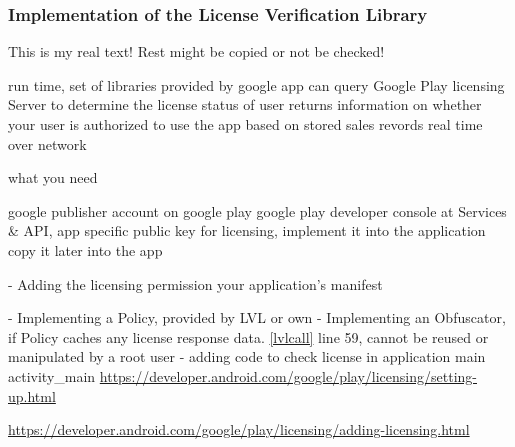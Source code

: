\subsubsection{Implementation of the License Verification Library}\label{subsection:license-google-implementation}
This is my real text! Rest might be copied or not be checked!



%
run time, set of libraries provided by google
app can query Google Play licensing Server to determine the license status of user
returns information on whether your user is authorized to use the app based on stored sales revords
real time over network
\cite{developersLicensingBlog}
%

%
what you need

google publisher account on google play
google play developer console at Services \& API, app specific public key for licensing, implement it into the application
copy it later into the app

\cite{developersLicensingAdding}
%

%
- Adding the licensing permission your application's manifest


- Implementing a Policy, provided by LVL or own
- Implementing an Obfuscator, if Policy caches any license response data. \ref{lvlcall} line 59, cannot be reused or manipulated by a root user
- adding code to check license in application main activity\_main
\cite{developersLicensingAdding}
%
\url{https://developer.android.com/google/play/licensing/setting-up.html}

\url{https://developer.android.com/google/play/licensing/adding-licensing.html}





